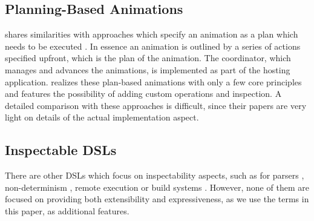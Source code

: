 \subsection{Planning-Based Animations}

\dsl{} shares similarities with approaches which specify an animation as a plan which needs to be executed \cite{DBLP:conf/chi/KurlanderL95} \cite{DBLP:conf/eics/MirlacherPB12}. In essence an animation is outlined by a series of actions specified upfront, which is the plan of the animation. The coordinator, which manages and advances the animations, is implemented as part of the hosting application. \dsl{} realizes these plan-based animations with only a few core principles and features the possibility of adding custom operations and inspection. A detailed comparison with these approaches is difficult, since their papers are very light on details of the actual implementation aspect.

\subsection{Inspectable DSLs}

There are other DSLs which focus on inspectability aspects, such as for parsers \cite{DBLP:journals/scp/Hughes00} \cite{DBLP:journals/corr/CapriottiK14} \cite{DBLP:conf/icfp/Lindley14}, non-determinism \cite{DBLP:journals/corr/abs-1905-06544}, remote execution \cite{DBLP:conf/haskell/Gibbons16} \cite{DBLP:conf/haskell/GillSDEFGRSS15} or build systems \cite{DBLP:journals/pacmpl/MokhovMJ18}. However, none of them are focused on providing both extensibility and expressiveness, as we use the terms in this paper, as additional features.

